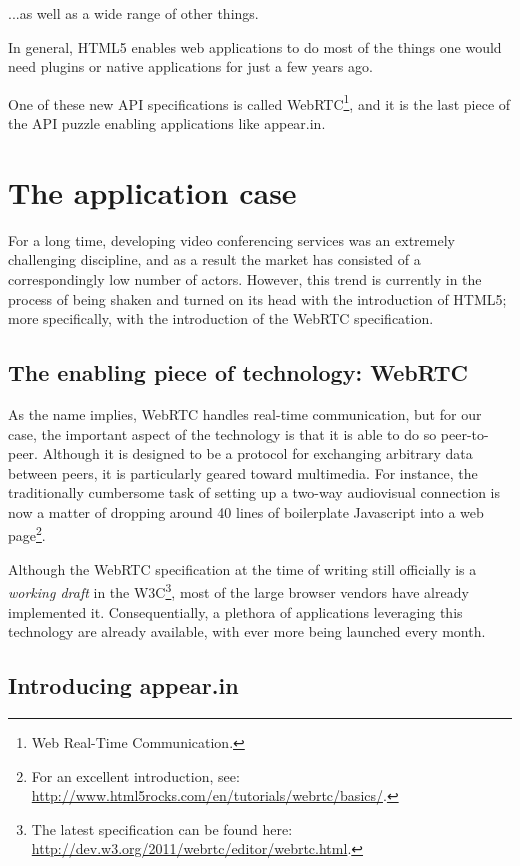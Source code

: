 ...as well as a wide range of other things.

In general, HTML5 enables web applications to do most of the things one would need plugins or native applications for just a few years ago.

One of these new API specifications is called WebRTC\footnote{Web Real-Time Communication.}, and it is the last piece of the API puzzle enabling applications like appear.in.

\section{The application case}
\label{intro:sec:appearin}

For a long time, developing video conferencing services was an extremely challenging discipline, and as a result the market has consisted of a correspondingly low number of actors. However, this trend is currently in the process of being shaken and turned on its head with the introduction of HTML5; more specifically, with the introduction of the WebRTC specification.

\subsection{The enabling piece of technology: WebRTC}

As the name implies, WebRTC handles real-time communication, but for our case, the important aspect of the technology is that it is able to do so peer-to-peer. Although it is designed to be a protocol for exchanging arbitrary data between peers, it is particularly geared toward multimedia. For instance, the traditionally cumbersome task of setting up a two-way audiovisual connection is now a matter of dropping around 40 lines of boilerplate Javascript into a web page\footnote{For an excellent introduction, see: \url{http://www.html5rocks.com/en/tutorials/webrtc/basics/}.}.

Although the WebRTC specification at the time of writing still officially is a \emph{working draft} in the W3C\footnote{The latest specification can be found here: \url{http://dev.w3.org/2011/webrtc/editor/webrtc.html}.}, most of the large browser vendors have already implemented it. Consequentially, a plethora of applications leveraging this technology are already available, with ever more being launched every month.

\subsection{Introducing appear.in}

